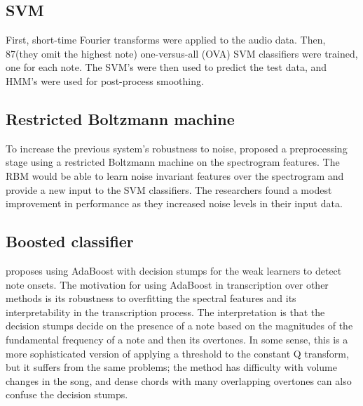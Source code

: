 \documentclass[5p]{elsarticle}
\begin{document}
\subsection{SVM}

\citet{poliner2006discriminative}

First, short-time Fourier transforms were applied to the audio data.  Then,  87(they omit the highest note) one-versus-all (OVA) SVM classifiers were trained, one for each note.  The SVM's were then used to predict the test data, and HMM's were used for post-process smoothing.

\subsection{Restricted Boltzmann machine}

To increase the previous system's robustness to noise, \citet{nam2011classification} proposed a preprocessing stage using a restricted Boltzmann machine on the spectrogram features. The RBM would be able to learn noise invariant features over the spectrogram and provide a new input to the SVM classifiers. The researchers found a modest improvement in performance as they increased noise levels in their input data.

\subsection{Boosted classifier}

\citet{boogaart2009note} proposes using AdaBoost with decision stumps for the weak learners to detect note onsets. The motivation for using AdaBoost in transcription over other methods is its robustness to overfitting the spectral features and its interpretability in the transcription process. The interpretation is that the decision stumps decide on the presence of a note based on the magnitudes of the fundamental frequency of a note and then its overtones. In some sense, this is a more sophisticated version of applying a threshold to the constant Q transform, but it suffers from the same problems; the method has difficulty with volume changes in the song, and dense chords with many overlapping overtones can also confuse the decision stumps.

\end{document}
